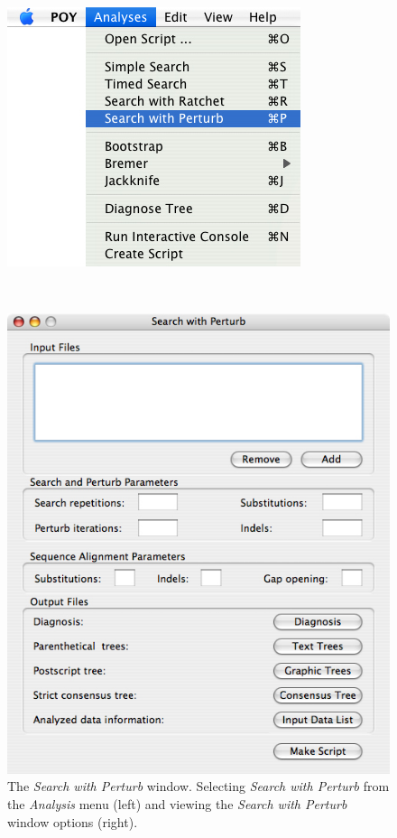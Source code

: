 {\begin{figure}
\centering
\begin{minipage}[c]{0.45\textwidth}
   		\includegraphics[width=\textwidth]{doc/figures/searchwithperturb_menu.jpg}
\end{minipage}
\,
\begin{minipage}[c]{0.52\textwidth}
	   	\includegraphics[width=\textwidth]{doc/figures/searchwithperturb_window.jpg}
   	\end{minipage} 
\caption{The \emph{Search with Perturb} window. Selecting \emph{Search with Perturb} from the \emph{Analysis} menu (left) and viewing the \emph{Search with Perturb} window options (right).}
\label{fig:search_with_perturb_window}
\end{figure}

}
